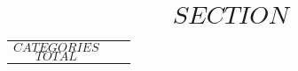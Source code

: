 

\clearpage

\section*{$$SECTION$$}

\begin{center}
    \begin{tabular}{l r r}
        $$CATEGORIES$$
        \hline
        $$TOTAL$$
    \end{tabular}
\end{center}